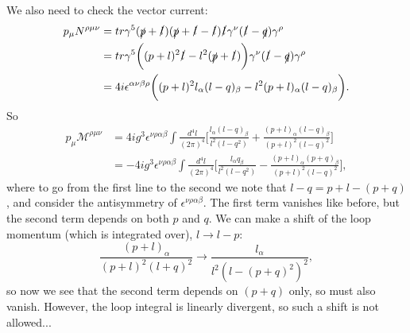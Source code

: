 We also need to check the vector current:
\begin{equation}
\begin{split}
p_\mu N^{\rho \mu \nu} &= tr \gamma^5 (\slashed{p} + \slashed{l})(\slashed{p}+ \slashed{l} - \slashed{l})\slashed{l} \gamma^\nu (\slashed{l} - \slashed{q}) \gamma^\rho \\
&= tr \gamma^5\bigg((p+l)^2\slashed{l} - l^2(\slashed{p}+\slashed{l})\bigg)\gamma^\nu (\slashed{l}-\slashed{q})\gamma^\rho \\ 
&= 4i \epsilon^{\alpha \nu \beta \rho} \bigg((p+l)^2l_\alpha(l-q)_\beta - l^2(p+l)_\alpha(l-q)_\beta \bigg).
\end{split}
\end{equation}
So 
\begin{equation}
\begin{split}
p_\mu \mathcal{M}^{\rho \mu \nu} &= 4ig^3 \epsilon^{\nu \rho \alpha \beta} \int \frac{d^4l}{(2\pi)^4} \bigg[ \frac{l_\alpha(l-q)_\beta}{l^2(l-q^2)} + \frac{(p+l)_\alpha (l-q)_\beta}{(p+l)^2(l-q)^2} \bigg] \\
&= -4ig^3 \epsilon^{\nu \rho \alpha \beta} \int \frac{d^4l}{(2\pi)^4} \bigg[ \frac{l_\alpha q_\beta}{l^2(l-q^2)} - \frac{(p+l)_\alpha (p+q)_\beta}{(p+l)^2(l-q)^2} \bigg],
\end{split}
\end{equation}
where to go from the first line to the second we note that $l-q=p+l-(p+q)$, and consider the antisymmetry of $\epsilon^{\nu\rho\alpha\beta}$. The first term vanishes like before, but the second term depends on both $p$ and $q$.  We can make a shift of the loop momentum (which is integrated over), $l \to l-p$:
\begin{equation}
\frac{(p+l)_\alpha}{(p+l)^2(l+q)^2} \to \frac{l_\alpha}{l^2(l-(p+q)^2)^2},
\end{equation}
so now we see that the second term depends on $(p+q)$ only, so must also vanish. However, the loop integral is linearly divergent, so such a shift is not allowed...

